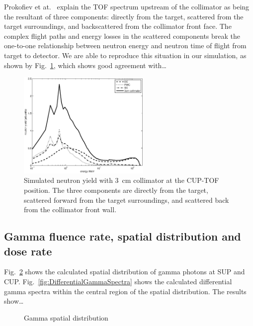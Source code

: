 \documentclass[11pt,a4paper]{IEEEtran}
\let\MYoriglatexcaption\caption
\renewcommand{\caption}[2][\relax]{\MYoriglatexcaption[#2]{#2}}
\begin{document}
Prokofiev et at.~\cite{Prokofiev14} explain the TOF spectrum upstream of the collimator as being the resultant of three components: directly from the target, scattered from the target surroundings, and backscattered from the collimator front face.
The complex flight paths and energy losses in the scattered components break the one-to-one relationship between neutron energy and neutron time of flight from target to detector.
We are able to reproduce this situation in our simulation, as shown by Fig.~\ref{fig:TOF3Componentslinear}, which shows good agreement with\ldots{}

\begin{figure}[t]
	\centering
	\includegraphics[width=2.5in]{TOF3Componentslinear.eps}
	\caption{
        Simulated neutron yield with \SI{3}{\cm} collimator at the CUP-TOF position.
        The three components are directly from the target, scattered forward from the target surroundings, and scattered back from the collimator front wall.
    }
	\label{fig:TOF3Componentslinear}
\end{figure}

\subsection{Gamma fluence rate, spatial distribution and dose rate}
Fig.~\ref{fig:GammaSpatialDistribution} shows the calculated spatial distribution of gamma photons at SUP and CUP.
Fig.~\ref{fig:DifferentialGammaSpectra} shows the calculated differential gamma spectra within the central region of the spatial distribution.
The results show\ldots{}

\begin{figure}[t]
    \begin{minipage}{\columnwidth}
        \label{fig:GammaSpatialDistributionSUP}
    \end{minipage}
    \begin{minipage}{\columnwidth}
        \label{fig:GammaSpatialDistributionCUP}
    \end{minipage}
    \caption{Gamma spatial distribution}
    \label{fig:GammaSpatialDistribution}
\end{figure}
\end{document}
